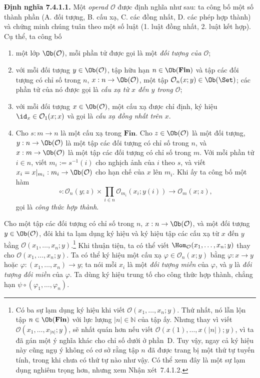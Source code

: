\noindent\textbf{Định nghĩa 7.4.1.1.}\keepwithnext
Một \emph{operad $\mathcal O$} được định nghĩa như sau: ta công bố một số thành phần (A. đối tượng, B. cấu xạ, C. các đồng nhất, D. các phép hợp thành) và chứng minh chúng tuân theo một số luật (1. luật đồng nhất, 2. luật kết hợp). Cụ thể, ta công bố
\begin{enumerate}[label=\Alph*.]
\item một lớp $\Ob(\mathcal O)$, mỗi phần tử được gọi là một \emph{đối tượng của $\mathcal O$};
\item với mỗi đối tượng $y\in\Ob(\mathcal O)$, tập hữu hạn $n\in\Ob(\mathbf{Fin})$ và tập các đối tượng có chỉ số trong $n$, $x:n\to\Ob(\mathcal O)$, một tập $\mathcal O_n(x;y)\in\Ob(\Set)$; các phần tử của nó được gọi là \emph{cấu xạ từ $x$ đến $y$ trong $\mathcal O$};
\item với mỗi đối tượng $x\in\Ob(\mathcal O)$, một cấu xạ được chỉ định, ký hiệu $\id_x\in\mathcal O_1(x;x)$ và gọi là \emph{cấu xạ đồng nhất trên $x$}.
\item Cho $s:m\to n$ là một cấu xạ trong $\mathbf{Fin}$. Cho $z\in\Ob(\mathcal O)$ là một đối tượng, $y:n\to\Ob(\mathcal O)$ là một tập các đối tượng có chỉ số trong $n$, và $x:m\to\Ob(\mathcal O)$ là một tập các đối tượng có chỉ số trong $m$. Với mỗi phần tử $i\in n$, viết $m_i:=s^{-1}(i)$ cho nghịch ảnh của $i$ theo $s$, và viết $x_i=x|_{m_i}:m_i\to\Ob(\mathcal O)$ cho hạn chế của $x$ lên $m_i$. Khi ấy ta công bố một hàm
\begin{equation}
\circ:\mathcal O_n(y;z)\times\prod_{i\in n}\mathcal O_{m_i}(x_i;y(i))\longrightarrow\mathcal O_m(x;z),
\tag{7.17}
\end{equation}
gọi là \emph{công thức hợp thành}.
\end{enumerate}
Cho một tập các đối tượng có chỉ số trong $n$, $x:n\to\Ob(\mathcal O)$, và một đối tượng $y\in\Ob(\mathcal O)$, đôi khi ta lạm dụng ký hiệu và ký hiệu tập các cấu xạ từ $x$ đến $y$ bằng $\mathcal O(x_1,\ldots,x_n;y)$.\footnote{Có ba sự lạm dụng ký hiệu khi viết $\mathcal O(x_1,\ldots,x_n;y)$. Thứ nhất, nó lẫn lộn tập $n\in\Ob(\mathbf{Fin})$ với lực lượng $|n|\in\mathbb N$ của tập ấy. Nhưng thay vì viết $\mathcal O(x_1,\ldots,x_{|n|};y)$, sẽ nhất quán hơn nếu viết $\mathcal O(x(1),\ldots,x(|n|);y)$, vì ta đã gán một ý nghĩa khác cho chỉ số dưới ở phần~D. Tuy vậy, ngay cả ký hiệu này cũng ngụ ý không có cơ sở rằng tập $n$ đã được trang bị một thứ tự tuyến tính, trong khi chưa có thứ tự nào như vậy. Có thể xem đây là một sự lạm dụng nghiêm trọng hơn, nhưng xem Nhận xét~7.4.1.2.} Khi thuận tiện, ta có thể viết $\Hom_{\mathcal O}(x_1,\ldots,x_n;y)$ thay cho $\mathcal O(x_1,\ldots,x_n;y)$. Ta có thể ký hiệu một cấu xạ $\varphi\in\mathcal O_n(x;y)$ bằng $\varphi:x\to y$ hoặc $\varphi:(x_1,\ldots,x_n)\to y$; ta nói mỗi $x_i$ là một \emph{đối tượng miền} của $\varphi$, và $y$ là \emph{đối tượng đối miền} của $\varphi$. Ta dùng ký hiệu trung tố cho công thức hợp thành, chẳng hạn $\psi\circ(\varphi_1,\ldots,\varphi_n)$.

